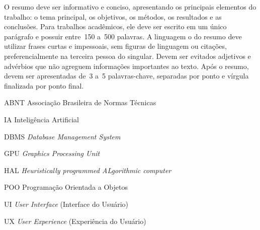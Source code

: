 \documentclass[
    12pt
    ,oneside
    ,a4paper
    ,chapter=TITLE
    ,section=TITLE
    ,sumario=abnt-6027-2012]{abntex2}
\begin{document}

\imprimircapa
\imprimirfolhaderosto

\begin{resumo}
    O resumo deve ser informativo e conciso, apresentando os principais elementos do trabalho: o
    tema principal, os objetivos, os métodos, os resultados e as conclusões. Para trabalhos
    acadêmicos, ele deve ser escrito em um único parágrafo e possuir entre~150 a~500 palavras.
    A linguagem o do resumo deve utilizar frases curtas e impessoais, sem figuras de linguagem
    ou citações, preferencialmente na terceira pessoa do singular. Devem ser evitados adjetivos
    e advérbios que não agreguem informações importantes ao texto.
    Após o resumo, devem ser apresentadas de~3 a~5 palavras-chave, separadas por ponto e
    vírgula finalizada por ponto final.

\end{resumo}


\listadefiguras
\listadegraficos
\listadetabelas
\listadequadros
\listadecodigos
\listadealgoritmos


\begin{siglas}
    \item[ABNT]   Associação Brasileira de Normas Técnicas
    \item[IA]     Inteligência Artificial
    \item[DBMS]   \textit{Database Management System}
    \item[GPU]    \textit{Graphics Processing Unit}
    \item[HAL]    \textit{Heuristically programmed ALgorithmic computer}
    \item[POO]    Programação Orientada a Objetos
    \item[UI]     \textit{User Interface} (Interface do Usuário)
    \item[UX]     \textit{User Experience} (Experiência do Usuário)
\end{siglas}
\end{document}
